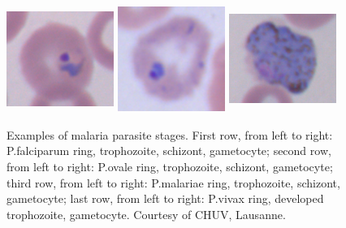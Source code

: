 \documentclass[sensors,review,submit,moreauthors,pdftex,10pt,a4paper]{mdpi}
\begin{document}
\begin{figure}[!t]
		\includegraphics[width=3.5cm, height=3.5cm]{img/vivax_1_ring}
		\includegraphics[width=3.5cm, height=3.5cm]{img/vivax_2c_trophozoiteDeveloped}
		\includegraphics[width=3.5cm, height=3.5cm]{img/vivax_4_gametocyte}
		\caption{\label{fig:malaria_stages}Examples of malaria parasite stages. 
			First row, from left to right: P.falciparum ring, trophozoite, schizont, gametocyte;
			second row, from left to right: P.ovale ring, trophozoite, schizont, gametocyte; 
			third row, from left to right: P.malariae ring, trophozoite, schizont, gametocyte; 
			last row, from left to right: P.vivax ring, developed trophozoite, gametocyte.
			\newline Courtesy of CHUV, Lausanne.}
	\end{figure}
	\fi
\end{document}
